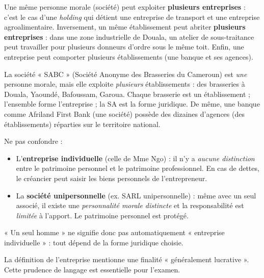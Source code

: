 \documentclass[11pt]{article}
\newcounter{popsec}
\newcounter{popsub}
\newcommand{\courssub}[1]{%
  \stepcounter{popsub}%
  \par\vspace{9pt}\noindent{\popxbold\fontsize{11.5}{13}\selectfont\color{popink}{\color{poporange}\thepopsec.\thepopsub}\hspace{6pt}#1}\par\nopagebreak\vspace{4pt}
}
\begin{document}
\begin{propriete}
Une même personne morale (société) peut exploiter \textbf{plusieurs entreprises} : c'est le cas d'une \emph{holding} qui détient une entreprise de transport et une entreprise agroalimentaire. Inversement, un même établissement peut abriter \textbf{plusieurs entreprises} : dans une zone industrielle de Douala, un atelier de sous-traitance peut travailler pour plusieurs donneurs d'ordre sous le même toit. Enfin, une entreprise peut comporter plusieurs établissements (une banque et ses agences).
\end{propriete}

\begin{exemplebox}
La société « SABC » (Société Anonyme des Brasseries du Cameroun) est \emph{une} personne morale, mais elle exploite \emph{plusieurs} établissements : des brasseries à Douala, Yaoundé, Bafoussam, Garoua. Chaque brasserie est un établissement ; l'ensemble forme l'entreprise ; la SA est la forme juridique. De même, une banque comme Afriland First Bank (une société) possède des dizaines d'agences (des établissements) réparties sur le territoire national.
\end{exemplebox}

\begin{attention}
Ne pas confondre :
\begin{itemize}
\item L'\textbf{entreprise individuelle} (celle de Mme Ngo) : il n'y a \emph{aucune distinction} entre le patrimoine personnel et le patrimoine professionnel. En cas de dettes, le créancier peut saisir les biens personnels de l'entrepreneur.
\item La \textbf{société unipersonnelle} (ex. SARL unipersonnelle) : même avec un seul associé, il existe une \emph{personnalité morale distincte} et la responsabilité est \emph{limitée} à l'apport. Le patrimoine personnel est protégé.
\end{itemize}
« Un seul homme » ne signifie donc pas automatiquement « entreprise individuelle » : tout dépend de la forme juridique choisie.
\end{attention}

\courssub{La finalité : lucrative ou non ?}

La définition de l'entreprise mentionne une finalité « généralement lucrative ». Cette prudence de langage est essentielle pour l'examen.
\end{document}

